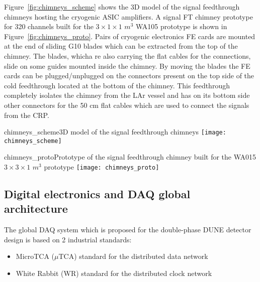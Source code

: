 Figure~\ref{fig:chimneys_scheme} shows the 3D model of the signal feedthrough chimneys hosting the cryogenic ASIC amplifiers. A signal FT chimney prototype for 320 channels built for the $3\times 1\times 1$ $m^3$ WA105 prototype is shown in Figure~\ref{fig:chimneys_proto}. Pairs of cryogenic electronics FE cards are mounted at the end of sliding G10 blades which can be extracted from the top of the chimney. The blades, whicha re also carrying the flat cables for the connections, slide on some guides mounted inside the chimney. By moving the blades the FE cards can be plugged/unplugged on the connectors present on the top side of the cold feedthrough located at the bottom of the chimney. This feedthrough completely isolates the chimney from the LAr vessel and has on its bottom side other connectors for the 50 cm flat cables which are used to connect the signals from the CRP.   

\begin{cdrfigure}{chimneys_scheme}{3D model of the signal feedthrough chimneys}
\texttt{[image: chimneys\_scheme]}
\end{cdrfigure}

\begin{cdrfigure}{chimneys_proto}{Prototype of the signal feedthrough chimney built for the WA015 $3\times3\times 1$ $m^3$ prototype}
\texttt{[image: chimneys\_proto]}
\end{cdrfigure}


\subsection{Digital electronics and DAQ global architecture}
The global DAQ system which is proposed for the double-phase DUNE detector design is based on 2 industrial standards:

\begin{itemize}
\item MicroTCA ($\mu$TCA) standard for the distributed data network \cite{mTCA-standard}
\item White Rabbit (WR) standard for the distributed clock network \cite{WR-standard}
\end{itemize}

